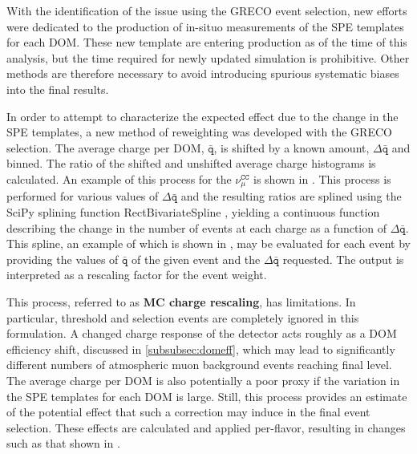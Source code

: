 With the identification of the issue using the GRECO event selection, new efforts were dedicated to the production of in-situo measurements of the SPE templates for each DOM.
These new template are entering production as of the time of this analysis, but the time required for newly updated simulation is prohibitive.
Other methods are therefore necessary to avoid introducing spurious systematic biases into the final results.

In order to attempt to characterize the expected effect due to the change in the SPE templates, a new method of reweighting was developed with the GRECO selection.
The average charge per DOM, $\mathtt{\bar{q}}$, is shifted by a known amount, $\mathtt{\Delta \bar{q}}$ and binned.
The ratio of the shifted and unshifted average charge histograms is calculated.
An example of this process for the $\mathtt{\nu_\mu^{CC}}$ is shown in .
This process is performed for various values of $\mathtt{\Delta \bar{q}}$ and the resulting ratios are splined using the SciPy splining function RectBivariateSpline , yielding a continuous function describing the change in the number of events at each charge as a function of $\mathtt{\Delta \bar{q}}$.
This spline, an example of which is shown in , may be evaluated for each event by providing the values of $\mathtt{\bar{q}}$ of the given event and the $\mathtt{\Delta \bar{q}}$ requested.
The output is interpreted as a rescaling factor for the event weight.

This process, referred to as \textbf{MC charge rescaling}, has limitations.
In particular, threshold and selection events are completely ignored in this formulation.
A changed charge response of the detector acts roughly as a DOM efficiency shift, discussed in \ref{subsubsec:domeff}, which may lead to significantly different numbers of atmospheric muon background events reaching final level.
The average charge per DOM is also potentially a poor proxy if the variation in the SPE templates for each DOM is large.
Still, this process provides an estimate of the potential effect that such a correction may induce in the final event selection.
These effects are calculated and applied per-flavor, resulting in changes such as that shown in .

